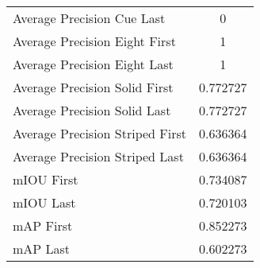 \begin{figure}
\begin{subfigure}[b]{0.49\textwidth}
\begin{tabular}{|l|c|}
        Average Precision Cue Last & 0 \\
        Average Precision Eight First & 1 \\
        Average Precision Eight Last & 1 \\
        Average Precision Solid First & 0.772727 \\
        Average Precision Solid Last & 0.772727 \\
        Average Precision Striped First & 0.636364 \\
        Average Precision Striped Last & 0.636364 \\
        \hline
        mIOU First & 0.734087 \\
        mIOU Last & 0.720103 \\
        mAP First & 0.852273 \\
        mAP Last & 0.602273 \\
        \hline
    \end{tabular}    
\end{subfigure}
\end{figure}

